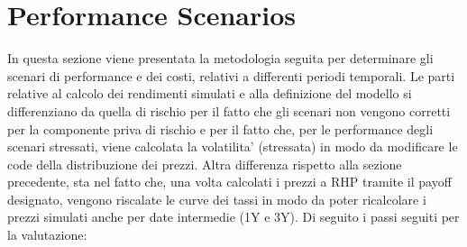 \documentclass[11pt,fleqn]{extarticle}
\begin{document}
\section{Performance Scenarios}
In questa sezione viene presentata la metodologia seguita per determinare gli scenari di performance e dei costi, relativi a differenti periodi temporali. Le parti relative al calcolo dei rendimenti simulati e alla definizione del modello si differenziano da quella di rischio per il fatto che gli scenari non vengono corretti per la componente priva di rischio e per il fatto che, per le performance degli scenari stressati, viene calcolata la volatilita' (stressata) in modo da modificare le code della distribuzione dei prezzi. Altra differenza rispetto alla sezione precedente, sta nel fatto che, una volta calcolati i prezzi a RHP tramite il payoff designato, vengono riscalate le curve dei tassi in modo da poter ricalcolare i prezzi simulati anche per date intermedie (1Y e 3Y). \newline
Di seguito i passi seguiti per la valutazione:
\end{document}
